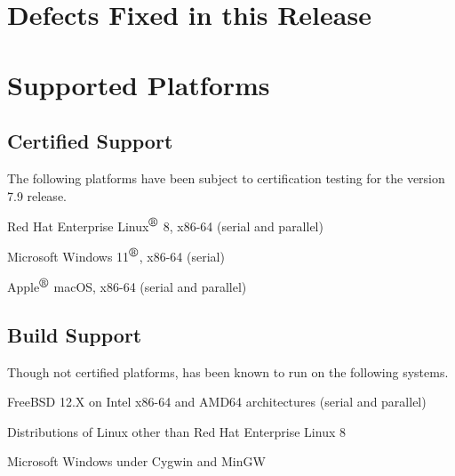 \documentclass[letterpaper]{scrartcl}
\begin{document}
\newpage
\section{Defects Fixed in this Release}


\newpage
\section{Supported Platforms}
\subsection*{Certified Support}
The following platforms have been subject to certification testing for the
\Xyce{} version 7.9 release.
\begin{XyceItemize}
  \item Red Hat Enterprise Linux${}^{\mbox{\textregistered}}$ 8, x86-64 (serial and parallel)
  \item Microsoft Windows 11${}^{\mbox{\textregistered}}$, x86-64 (serial)
  \item Apple${}^{\mbox{\textregistered}}$ macOS, x86-64 (serial and parallel)
\end{XyceItemize}


\subsection*{Build Support}
Though not certified platforms, \Xyce{} has been known to run on the following
systems.
\begin{XyceItemize}
  \item FreeBSD 12.X on Intel x86-64 and AMD64 architectures (serial
    and parallel)
  \item Distributions of Linux other than Red Hat Enterprise Linux 8
  \item Microsoft Windows under Cygwin and MinGW
\end{XyceItemize}
\end{document}
